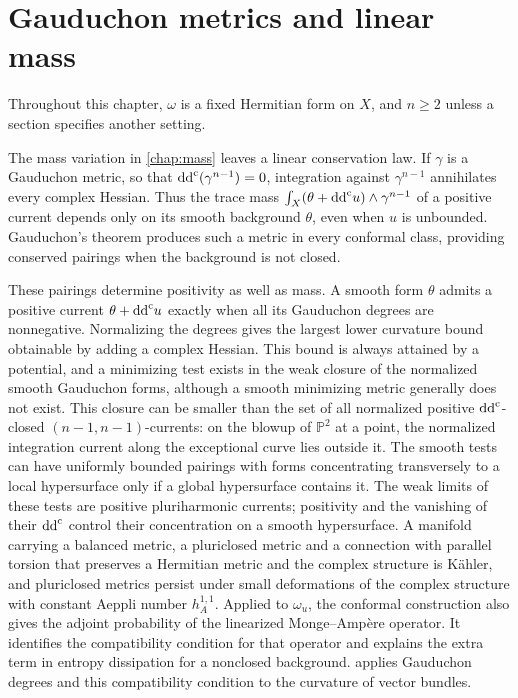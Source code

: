 \chapter{Gauduchon metrics and linear mass}
\label{chap:gauduchon}

Throughout this chapter, $\omega$ is a fixed Hermitian form on $X$, and $n\geq2$ unless a section specifies another setting.

The mass variation in \cref{chap:mass} leaves a linear conservation law. If $\gamma$ is a Gauduchon metric, so that $\mathrm{dd}^{\mathrm{c}}(\gamma^{n-1})=0$, integration against $\gamma^{n-1}$ annihilates every complex Hessian. Thus the trace mass $\int_X(\theta+\mathrm{dd}^{\mathrm{c}} u)\wedge\gamma^{n-1}$ of a positive current depends only on its smooth background $\theta$, even when $u$ is unbounded. Gauduchon's theorem produces such a metric in every conformal class, providing conserved pairings when the background is not closed.

These pairings determine positivity as well as mass. A smooth form $\theta$ admits a positive current $\theta+\mathrm{dd}^{\mathrm{c}} u$ exactly when all its Gauduchon degrees are nonnegative. Normalizing the degrees gives the largest lower curvature bound obtainable by adding a complex Hessian. This bound is always attained by a potential, and a minimizing test exists in the weak closure of the normalized smooth Gauduchon forms, although a smooth minimizing metric generally does not exist. This closure can be smaller than the set of all normalized positive $\mathrm{dd}^{\mathrm{c}}$-closed $(n-1,n-1)$-currents: on the blowup of $\mathbb P^2$ at a point, the normalized integration current along the exceptional curve lies outside it. The smooth tests can have uniformly bounded pairings with forms concentrating transversely to a local hypersurface only if a global hypersurface contains it. The weak limits of these tests are positive pluriharmonic currents; positivity and the vanishing of their $\mathrm{dd}^{\mathrm{c}}$ control their concentration on a smooth hypersurface. A manifold carrying a balanced metric, a pluriclosed metric and a connection with parallel torsion that preserves a Hermitian metric and the complex structure is K\"ahler, and pluriclosed metrics persist under small deformations of the complex structure with constant Aeppli number $h_A^{1,1}$. Applied to $\omega_u$, the conformal construction also gives the adjoint probability of the linearized Monge--Amp\`ere operator. It identifies the compatibility condition for that operator and explains the extra term in entropy dissipation for a nonclosed background.  applies Gauduchon degrees and this compatibility condition to the curvature of vector bundles.


